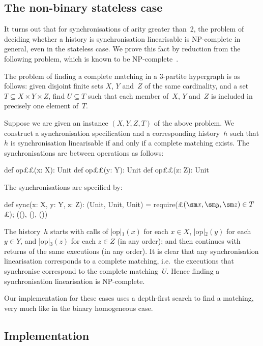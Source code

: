 \subsection{The non-binary stateless case}
\label{sec:non-binary-stateless}

It turns out that for synchronisations of arity greater than~2, the problem of
deciding whether a history is synchronisation linearisable is NP-complete in
general, even in the stateless case.  We prove this fact by reduction from the
following problem, which is known to be NP-complete~\cite{Karp1972}.
%
\begin{definition}
The problem of finding a complete matching in a 3-partite hypergraph is as
follows: given disjoint finite sets $X$, $Y$ and~$Z$ of the same cardinality,
and a set $T \subseteq X \times Y \times Z$, find $U \subseteq T$ such that
each member of~$X$, $Y$ and~$Z$ is included in precisely one element of~$T$.
\end{definition}

Suppose we are given an instance $(X, Y, Z, T)$ of the above problem.  We
construct a synchronisation specification and a corresponding history~$h$ such
that $h$ is synchronisation linearisable if and only if a complete matching
exists.  The synchronisations are between operations as follows:
\begin{scala}
  def op££(x: X): Unit
  def op££(y: Y): Unit
  def op££(z: Z): Unit
\end{scala}
%
The synchronisations are specified by:
%
\begin{scala}
  def sync(x: X, y: Y, z: Z): (Unit, Unit, Unit) = {
    require(£$(\sm x, \sm y, \sm z) \in T$£); ((), (), ())
  }
\end{scala}
%
The history~$h$ starts with calls of |op|$_1(x)$ for each $x \in X$,
|op|$_2(y)$ for each $y \in Y$, and |op|$_3(z)$ for each $z \in Z$ (in any
order); and then continues with returns of the same executions (in any
order).  It is clear that any synchronisation linearisation corresponds to a
complete matching, i.e.~the executions that synchronise correspond to the
complete matching~$U$.  Hence finding a synchronisation linearisation is
NP-complete. 

Our implementation for these cases uses a depth-first search to find a
matching, very much like in the binary homogeneous case.


\subsection{Implementation}

